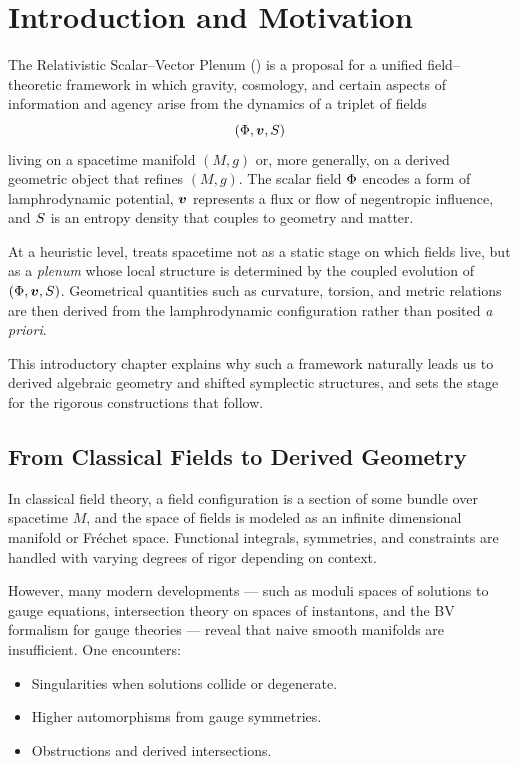 
\chapter{Introduction and Motivation}
\label{chap:intro}

The Relativistic Scalar--Vector Plenum (\rsvpabbr{}) is a proposal for a
unified field--theoretic framework in which gravity, cosmology, and certain
aspects of information and agency arise from the dynamics of a triplet of
fields
\[
  (\Phi,\bm{v},S)
\]
living on a spacetime manifold $(M,g)$ or, more generally, on a derived
geometric object that refines $(M,g)$. The scalar field $\Phi$ encodes a
form of lamphrodynamic potential, $\bm{v}$ represents a flux or flow of
negentropic influence, and $S$ is an entropy density that couples to
geometry and matter.

At a heuristic level, \rsvpabbr{} treats spacetime not as a static stage on
which fields live, but as a \emph{plenum} whose local structure is determined
by the coupled evolution of $(\Phi,\bm{v},S)$. Geometrical
quantities such as curvature, torsion, and metric relations are then derived
from the lamphrodynamic configuration rather than posited \emph{a priori}.

This introductory chapter explains why such a framework naturally leads us to
derived algebraic geometry and shifted symplectic structures, and sets the
stage for the rigorous constructions that follow.

\section{From Classical Fields to Derived Geometry}

In classical field theory, a field configuration is a section of some
bundle over spacetime $M$, and the space of fields is modeled as an infinite
dimensional manifold or Fréchet space. Functional integrals, symmetries, and
constraints are handled with varying degrees of rigor depending on context.

However, many modern developments --- such as moduli spaces of solutions to
gauge equations, intersection theory on spaces of instantons, and the BV
formalism for gauge theories --- reveal that naive smooth manifolds are
insufficient. One encounters:
\begin{itemize}
  \item Singularities when solutions collide or degenerate.
  \item Higher automorphisms from gauge symmetries.
  \item Obstructions and derived intersections.
\end{itemize}

